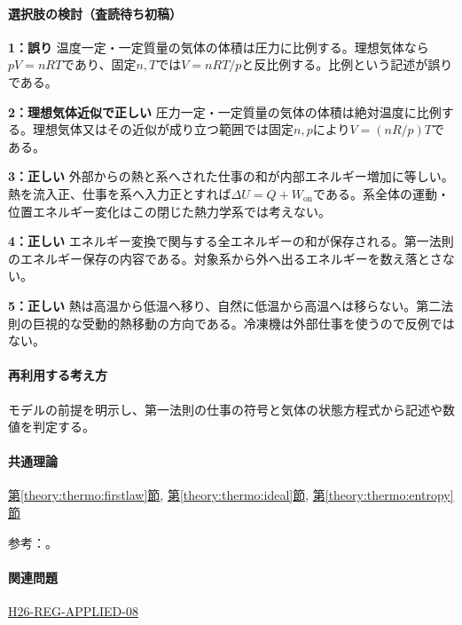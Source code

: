 \paragraph{選択肢の検討（査読待ち初稿）}\mbox{}\par

\noindent\textbf{1：誤り} 温度一定・一定質量の気体の体積は圧力に比例する。理想気体なら\(pV=nRT\)であり、固定\(n,T\)では\(V=nRT/p\)と反比例する。比例という記述が誤りである。\par

\noindent\textbf{2：理想気体近似で正しい} 圧力一定・一定質量の気体の体積は絶対温度に比例する。理想気体又はその近似が成り立つ範囲では固定\(n,p\)により\(V=(nR/p)T\)である。\par

\noindent\textbf{3：正しい} 外部からの熱と系へされた仕事の和が内部エネルギー増加に等しい。熱を流入正、仕事を系へ入力正とすれば\(\Delta U=Q+W_{\mathrm{on}}\)である。系全体の運動・位置エネルギー変化はこの閉じた熱力学系では考えない。\par

\noindent\textbf{4：正しい} エネルギー変換で関与する全エネルギーの和が保存される。第一法則のエネルギー保存の内容である。対象系から外へ出るエネルギーを数え落とさない。\par

\noindent\textbf{5：正しい} 熱は高温から低温へ移り、自然に低温から高温へは移らない。第二法則の巨視的な受動的熱移動の方向である。冷凍機は外部仕事を使うので反例ではない。\par

\paragraph{再利用する考え方} モデルの前提を明示し、第一法則の仕事の符号と気体の状態方程式から記述や数値を判定する。

\paragraph{共通理論} \hyperref[theory:thermo:firstlaw]{第\ref*{theory:thermo:firstlaw}節}, \hyperref[theory:thermo:ideal]{第\ref*{theory:thermo:ideal}節}, \hyperref[theory:thermo:entropy]{第\ref*{theory:thermo:entropy}節}

\par 参考：\cite{mit_thermo_firstlaw2008}。

\paragraph{関連問題} \hyperref[q:h26-reg-applied-08]{H26-REG-APPLIED-08}

